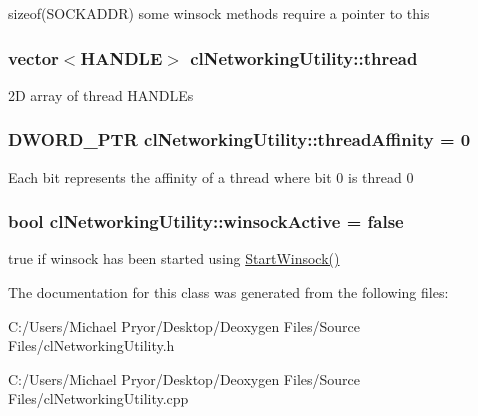 \label{classcl_networking_utility_a770140d003b41cb571e83988a96c9c50}
sizeof(SOCKADDR) some winsock methods require a pointer to this \hypertarget{classcl_networking_utility_ad039e5b653267dc859efd3bc227038e9}{
\subsubsection[{thread}]{\setlength{\rightskip}{0pt plus 5cm}vector$<$HANDLE$>$ {\bf clNetworkingUtility::thread}}}
\label{classcl_networking_utility_ad039e5b653267dc859efd3bc227038e9}
2D array of thread HANDLEs \hypertarget{classcl_networking_utility_a282c5753f6f2ca19c16274e16851ba0c}{
\subsubsection[{threadAffinity}]{\setlength{\rightskip}{0pt plus 5cm}DWORD\_\-PTR {\bf clNetworkingUtility::threadAffinity} = 0}}
\label{classcl_networking_utility_a282c5753f6f2ca19c16274e16851ba0c}
Each bit represents the affinity of a thread where bit 0 is thread 0 \hypertarget{classcl_networking_utility_a6d1bd1ea9a0533307f0a1cb034d94980}{
\subsubsection[{winsockActive}]{\setlength{\rightskip}{0pt plus 5cm}bool {\bf clNetworkingUtility::winsockActive} = false}}
\label{classcl_networking_utility_a6d1bd1ea9a0533307f0a1cb034d94980}
true if winsock has been started using \hyperlink{classcl_networking_utility_a7d5ae3406c401acd827caae8119e94e5}{StartWinsock()} 

The documentation for this class was generated from the following files:\begin{DoxyCompactItemize}
\item 
C:/Users/Michael Pryor/Desktop/Deoxygen Files/Source Files/clNetworkingUtility.h\item 
C:/Users/Michael Pryor/Desktop/Deoxygen Files/Source Files/clNetworkingUtility.cpp\end{DoxyCompactItemize}
